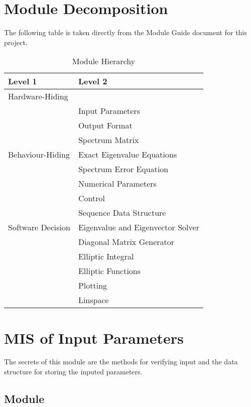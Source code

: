 \documentclass[12pt, titlepage]{article}
\begin{document}
\section{Module Decomposition}

The following table is taken directly from the Module Guide document for this project.

\begin{table}[h!]
\centering
\begin{tabular}{p{} p{}}
\toprule
\textbf{Level 1} & \textbf{Level 2}\\
\midrule

{Hardware-Hiding} & ~ \\
\midrule

\multirow{7}{0.3\textwidth}{Behaviour-Hiding} 
& Input Parameters \\
& Output Format \\
& Spectrum Matrix \\
& Exact Eigenvalue Equations \\
& Spectrum Error Equation \\
& Numerical Parameters \\  
& Control \\ 
\midrule

\multirow{3}{0.3\textwidth}{Software Decision} & {Sequence Data Structure}\\
& Eigenvalue and Eigenvector Solver \\
& Diagonal Matrix Generator\\
& Elliptic Integral\\ 
& Elliptic Functions\\ 
& Plotting \\ 
& Linspace \\
\bottomrule

\end{tabular}
\caption{Module Hierarchy}
\label{TblMH}
\end{table}

\newpage

\section{MIS of Input Parameters} \label{IPM} 

The secrets of this module are the methods for verifying input and the data 
structure for storing the inputed parameters. 

\subsection{Module} 
\end{document}
